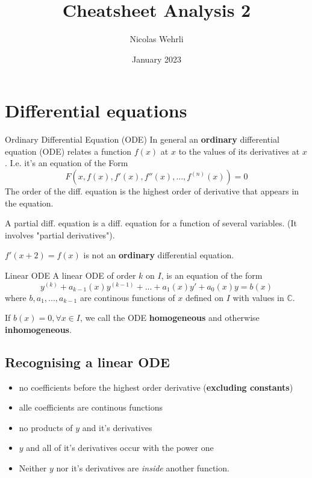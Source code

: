 \documentclass[a4paper,fontsize = 10pt]{article}
\title{Cheatsheet Analysis 2}
\author{Nicolas Wehrli}
\date{January 2023}
\def\C{\mathbb{C}}
\begin{document}
\maketitle

\setlength{\abovedisplayskip}{3pt}
\setlength{\belowdisplayskip}{3pt}
\setlength{\lineskip}{0pt}
\setlength{\parindent}{0pt}
\footnotesize

\section{Differential equations}
\begin{mainbox}{Ordinary Differential Equation (ODE)}
    In general an \textbf{ordinary} differential equation (ODE) relates a function $f(x)$ at $x$ to the values of its derivatives at $x$.
    I.e. it's an equation of the Form $$F(x, f(x), f'(x), f''(x), ..., f^{(n)}(x)) = 0$$ 
    The order of the diff. equation is the highest order of derivative that appears in the equation.

    A partial diff. equation is a diff. equation for a function of several variables. (It involves "partial derivatives").
\end{mainbox}
$f'(x+2) = f(x)$ is not an \textbf{ordinary} differential equation.

\begin{mainbox}{Linear ODE}
    A linear ODE of order $k$ on $I$, is an equation of the form $$y^{(k)} + a_{k-1}(x)y^{(k-1)}+...+a_1(x)y'+a_0(x)y = b(x)$$ 
    where $b, a_1, ..., a_{k-1}$ are continous functions of $x$ defined on $I$ with values in $\C$.

    If $b(x) = 0, \forall x \in I$, we call the ODE \textbf{homogeneous} and otherwise \textbf{inhomogeneous}. 
\end{mainbox}

\subsection*{Recognising a linear ODE}
\begin{itemize}
    \item no coefficients before the highest order derivative (\textbf{excluding constants})
    \item alle coefficients are continous functions
    \item no products of $y$ and it's derivatives
    \item $y$ and all of it's derivatives occur with the power one
    \item Neither $y$ nor it's derivatives are \textit{inside} another function.
\end{itemize}
\end{document}
